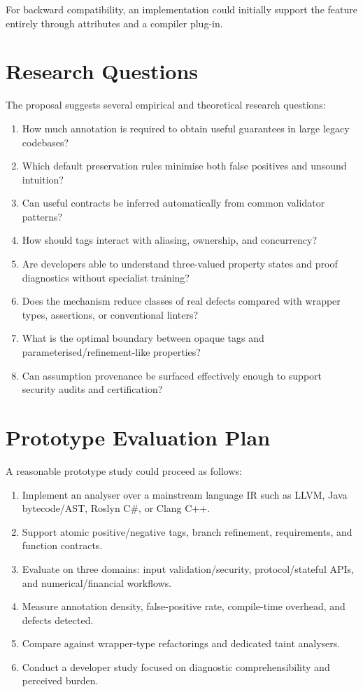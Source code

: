 \documentclass[11pt]{article}
\begin{document}
For backward compatibility, an implementation could initially support the feature entirely through attributes and a compiler plug-in.

\section{Research Questions}
The proposal suggests several empirical and theoretical research questions:

\begin{enumerate}
  \item How much annotation is required to obtain useful guarantees in large legacy codebases?
  \item Which default preservation rules minimise both false positives and unsound intuition?
  \item Can useful contracts be inferred automatically from common validator patterns?
  \item How should tags interact with aliasing, ownership, and concurrency?
  \item Are developers able to understand three-valued property states and proof diagnostics without specialist training?
  \item Does the mechanism reduce classes of real defects compared with wrapper types, assertions, or conventional linters?
  \item What is the optimal boundary between opaque tags and parameterised/refinement-like properties?
  \item Can assumption provenance be surfaced effectively enough to support security audits and certification?
\end{enumerate}

\section{Prototype Evaluation Plan}
A reasonable prototype study could proceed as follows:

\begin{enumerate}
  \item Implement an analyser over a mainstream language IR such as LLVM, Java bytecode/AST, Roslyn C\#, or Clang C++.
  \item Support atomic positive/negative tags, branch refinement, requirements, and function contracts.
  \item Evaluate on three domains: input validation/security, protocol/stateful APIs, and numerical/financial workflows.
  \item Measure annotation density, false-positive rate, compile-time overhead, and defects detected.
  \item Compare against wrapper-type refactorings and dedicated taint analysers.
  \item Conduct a developer study focused on diagnostic comprehensibility and perceived burden.
\end{enumerate}
\end{document}
